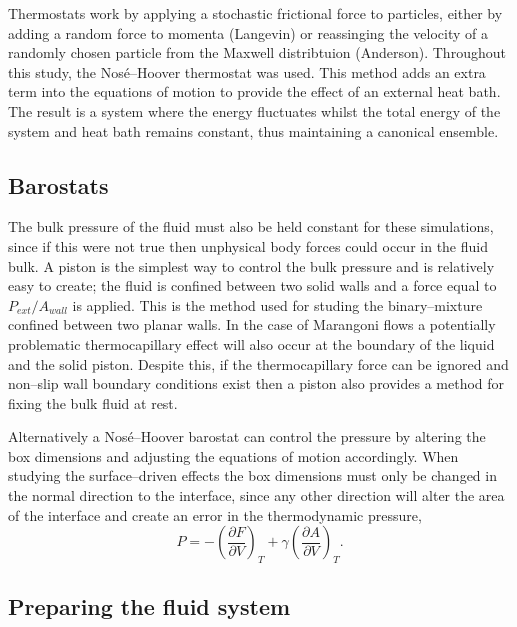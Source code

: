 Thermostats work by applying a stochastic frictional force to particles, either by adding a random force to momenta (Langevin)\cite{Langevin} or reassinging the velocity of a randomly chosen particle from the Maxwell distribtuion (Anderson)\cite{AndersonTherm}.
Throughout this study, the Nos\'{e}--Hoover thermostat was used.
This method adds an extra term into the equations of motion to provide the effect of an external heat bath.\cite{NoseHoover1, NoseHoover2, NoseHoover3}
The result is a system where the energy fluctuates whilst the total energy of the system and heat bath remains constant, thus maintaining a canonical ensemble.

\subsection{Barostats}
The bulk pressure of the fluid must also be held constant for these simulations, since if this were not true then unphysical body forces could occur in the fluid bulk.
A piston is the simplest way to control the bulk pressure and is relatively easy to create; the fluid is confined between two solid walls and a force equal to $P_{ext} / A_{wall}$ is applied.
This is the method used for studing the binary--mixture confined between two planar walls.
In the case of Marangoni flows a potentially problematic thermocapillary effect will also occur at the boundary of the liquid and the solid piston.
Despite this, if the thermocapillary force can be ignored and non--slip wall boundary conditions exist then a piston also provides a method for fixing the bulk fluid at rest.

Alternatively a Nos\'{e}--Hoover barostat can control the pressure by altering the box dimensions and adjusting the equations of motion accordingly. \cite{NoseHoover1, NoseHoover2, NoseHoover3}
When studying the surface--driven effects the box dimensions must only be changed in the normal direction to the interface, since any other direction will alter the area of the interface and create an error in the thermodynamic pressure,
\begin{equation}
P = - \left( \frac{\partial F}{\partial V} \right)_{T} + \gamma \left( \frac{\partial A}{\partial V} \right)_{T}.
\end{equation}

\subsection{Preparing the fluid system}

